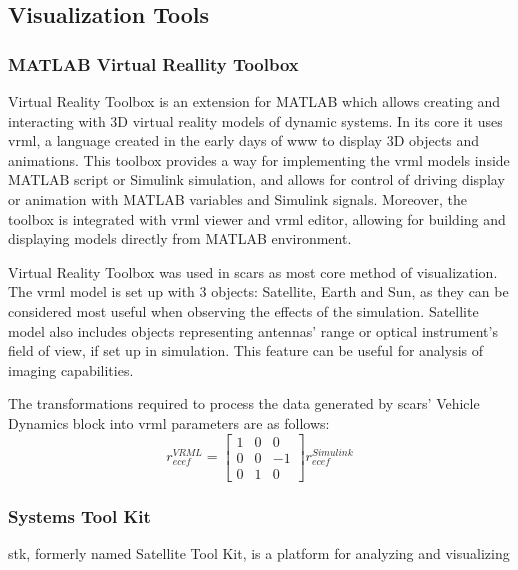 \subsection{Visualization Tools}\label{sec:visualization}
    \subsubsection{MATLAB Virtual Reallity Toolbox}
        Virtual Reality Toolbox is an extension for MATLAB which allows creating and interacting with 3D virtual reality models of dynamic systems. In its core it uses \ac{vrml}, a language created in the early days of \ac{www} to display 3D objects and animations. This toolbox provides a way for implementing the \ac{vrml} models inside MATLAB script or Simulink simulation, and allows for control of driving display or animation with MATLAB variables and Simulink signals. Moreover, the toolbox is integrated with \ac{vrml} viewer and \ac{vrml} editor, allowing for building and displaying models directly from MATLAB environment.

        Virtual Reality Toolbox was used in \ac{scars} as most core method of visualization. The \ac{vrml} model is set up with 3 objects: Satellite, Earth and Sun, as they can be considered most useful when observing the effects of the simulation. Satellite model also includes objects representing antennas' range or optical instrument's field of view, if set up in simulation. This feature can be useful for analysis of imaging capabilities.

        The transformations required to process the data generated by \ac{scars}' Vehicle Dynamics block into \ac{vrml} parameters are as follows:
        \begin{equation}
            r_{ecef}^{VRML}=
            \begin{bmatrix}
            1&0&0\\ 
            0&0&-1\\ 
            0&1&0
            \end{bmatrix}
            r^{Simulink}_{ecef}
        \end{equation}
        
        


    \subsubsection{Systems Tool Kit}
        \ac{stk}, formerly named Satellite Tool Kit, is a platform for analyzing and visualizing 


